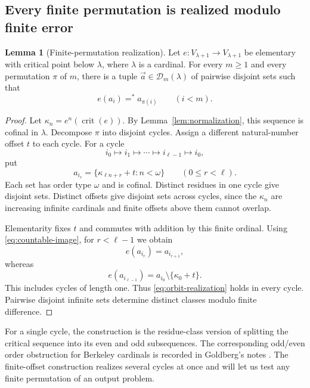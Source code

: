 \documentclass[11pt,letterpaper]{article}
\theoremstyle{definition}
\newtheorem{lemma}[definition]{Lemma}
\newcommand{\crit}{\operatorname{crit}}
\newcommand{\DD}{\mathcal D}
\newcommand{\fineq}{\mathrel{=^{*}}}
\begin{document}
\subsection{Every finite permutation is realized modulo finite error}

\begin{lemma}[Finite-permutation realization]\label{lem:finite-orbits}
Let $e:V_{\lambda+1}\to V_{\lambda+1}$ be elementary with critical point below $\lambda$, where $\lambda$ is a cardinal. For every $m\geq1$ and every permutation $\pi$ of $m$, there is a tuple $\vec a\in\DD_m(\lambda)$ of pairwise disjoint sets such that
\begin{equation}\label{eq:orbit-realization}
 e(a_i)\fineq a_{\pi(i)}\qquad(i<m).
\end{equation}
\end{lemma}

\begin{proof}
Let $\kappa_n=e^n(\crit(e))$. By Lemma~\ref{lem:normalization}, this sequence is cofinal in $\lambda$. Decompose $\pi$ into disjoint cycles. Assign a different natural-number offset $t$ to each cycle. For a cycle
\[
 i_0\longmapsto i_1\longmapsto\cdots
             \longmapsto i_{\ell-1}\longmapsto i_0,
\]
put
\begin{equation}\label{eq:cycle-formula}
 a_{i_r}=\{\kappa_{\ell n+r}+t:n<\omega\}
 \qquad(0\leq r<\ell).
\end{equation}
Each set has order type $\omega$ and is cofinal. Distinct residues in one cycle give disjoint sets. Distinct offsets give disjoint sets across cycles, since the $\kappa_n$ are increasing infinite cardinals and finite offsets above them cannot overlap.

Elementarity fixes $t$ and commutes with addition by this finite ordinal. Using \eqref{eq:countable-image}, for $r<\ell-1$ we obtain
\[
 e(a_{i_r})=a_{i_{r+1}},
\]
whereas
\[
 e(a_{i_{\ell-1}})=a_{i_0}\setminus\{\kappa_0+t\}.
\]
This includes cycles of length one. Thus \eqref{eq:orbit-realization} holds in every cycle. Pairwise disjoint infinite sets determine distinct classes modulo finite difference.
\end{proof}

For a single cycle, the construction is the residue-class version of splitting the critical sequence into its even and odd subsequences. The corresponding odd/even order obstruction for Berkeley cardinals is recorded in Goldberg's notes \cite[Remark 2.4]{cover}. The finite-offset construction realizes several cycles at once and will let us test any finite permutation of an output problem.
\end{document}
